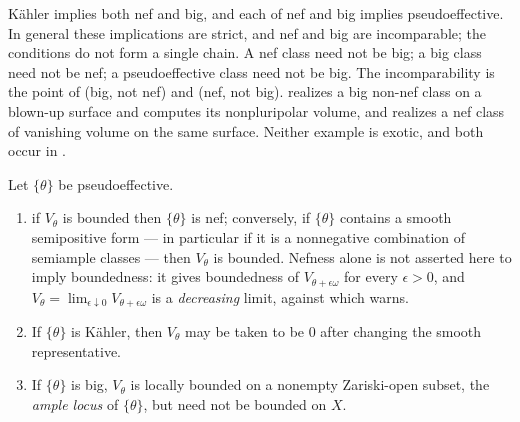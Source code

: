 K\"ahler implies both nef and big, and each of nef and big implies
pseudoeffective.  In general these implications are strict, and nef and
big are incomparable; the conditions do not form a single chain.  A nef
class need not be big; a big class need not be nef; a
pseudoeffective class need not be big.  The incomparability is the point of
 (big, not nef) and
 (nef, not big).
 realizes a big non-nef class on a blown-up
surface and computes its nonpluripolar volume, and
 realizes a nef class of vanishing volume on
the same surface.  Neither example is exotic, and both occur in
.

\begin{proposition}\label{prop:ch51-vtheta-bounded-iff}
Let $\{\theta\}$ be pseudoeffective.
\begin{enumerate}
\item\label{itm:ch51-vtheta:kahler}
            if $V_\theta$ is bounded then $\{\theta\}$ is nef; conversely, if
      $\{\theta\}$ contains a smooth semipositive form --- in particular if
      it is a nonnegative combination of semiample classes --- then
      $V_\theta$ is bounded.  Nefness alone is not asserted here to imply
      boundedness: it gives boundedness of $V_{\theta+\epsilon\omega}$ for
      every $\epsilon>0$, and
      $V_\theta=\lim_{\epsilon\downarrow0}V_{\theta+\epsilon\omega}$ is a
      \emph{decreasing} limit, against which
       warns.
\item\label{itm:ch51-vtheta:continuous}
      If $\{\theta\}$ is K\"ahler, then $V_\theta$ may be taken to be
      $0$ after changing the smooth representative.
\item\label{itm:ch51-vtheta:big}
      If $\{\theta\}$ is big, $V_\theta$ is locally bounded on a
      nonempty Zariski-open subset, the \emph{ample locus} of
      $\{\theta\}$, but need not be bounded on $X$.
\end{enumerate}
\end{proposition}

